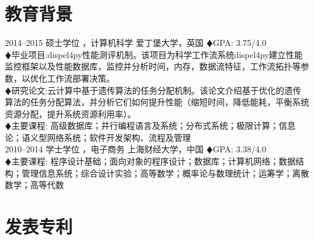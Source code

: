 \documentclass[]{friggeri-cv-cn} %
\begin{document}

\section{教育背景}

\begin{entrylist}
	\entry
	{2014--2015}
	{硕士学位 {\normalfont ，计算机科学}}
	{爱丁堡大学，英国}
	{
		{\color{red} $\vardiamondsuit $}GPA: 3.75/4.0\\
		{\color{red} $\vardiamondsuit $}毕业项目:dispel4py性能测评机制。该项目为科学工作流系统dispel4py建立性能监控框架以及性能数据库，监控并分析时间，内存，数据流特征，工作流拓扑等参数，以优化工作流部署决策。\\
		{\color{red} $\vardiamondsuit $}研究论文:云计算中基于遗传算法的任务分配机制。该论文介绍基于优化的遗传算法的任务分配算法，并分析它们如何提升性能（缩短时间，降低能耗，平衡系统资源分配，提升系统资源利用率）。\\
		{\color{red} $\vardiamondsuit $}主要课程:
		高级数据库；并行编程语言及系统；分布式系统；极限计算；信息论；语义型网络系统；软件开发架构、流程及管理
	}
\\
	\entry
	{2010--2014}
	{学士学位 {\normalfont ，电子商务}}
	{上海财经大学，中国}
	{
		{\color{red} $\vardiamondsuit $}GPA: 3.38/4.0\\
		{\color{red} $\vardiamondsuit $}主要课程:
		程序设计基础；面向对象的程序设计；数据库；计算机网络；数据结构；管理信息系统；综合设计实验；高等数学；概率论与数理统计；运筹学；离散数学；高等代数
	}
\end{entrylist}

%
\section{发表专利}


\end{document}
